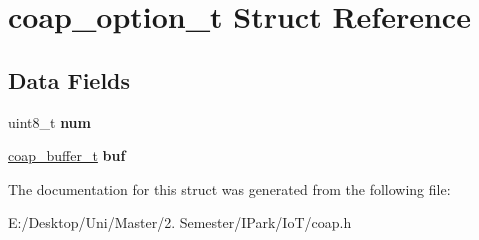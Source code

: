 \hypertarget{structcoap__option__t}{}\section{coap\+\_\+option\+\_\+t Struct Reference}
\label{structcoap__option__t}
\subsection*{Data Fields}
\begin{DoxyCompactItemize}
\item 
\mbox{\label{structcoap__option__t_abea371f9030e15a5d2a4c181576833d8}} 
uint8\+\_\+t {\bfseries num}
\item 
\mbox{\label{structcoap__option__t_aa80f841143cf439591c7c3e39204625f}} 
\hyperlink{structcoap__buffer__t}{coap\+\_\+buffer\+\_\+t} {\bfseries buf}
\end{DoxyCompactItemize}


The documentation for this struct was generated from the following file\+:\begin{DoxyCompactItemize}
\item 
E\+:/\+Desktop/\+Uni/\+Master/2. Semester/\+I\+Park/\+Io\+T/coap.\+h\end{DoxyCompactItemize}
